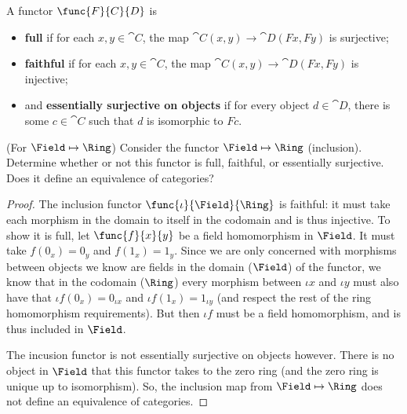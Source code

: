 \documentclass[main.tex]{subfiles}
\begin{document}
\begin{definition}
	A functor $\func{F}{C}{D}$ is
	\begin{itemize}
		\item \textbf{full} if for each $x,y\in \cat{C}$, the map $\cat{C}(x,y)\rightarrow\cat{D}(Fx,Fy)$ is surjective;
		\item \textbf{faithful} if for each $x,y\in \cat{C}$, the map $\cat{C}(x,y)\rightarrow\cat{D}(Fx,Fy)$ is injective;
		\item and \textbf{essentially surjective on objects} if for every object $d\in\cat{D}$, there is some $c\in\cat{C}$ such that $d$ is isomorphic to $Fc$.
	\end{itemize}
\end{definition}

\begin{exercise}(For $\Field\mapsto\Ring$)
	Consider the functor $\Field\mapsto\Ring$ (inclusion). Determine whether or not this functor is full, faithful, or essentially surjective. Does it define an equivalence of categories?
\end{exercise}

\begin{proof}
	The inclusion functor $\func{\iota}{\Field}{\Ring}$ is faithful: it must take each morphism in the domain to itself in the codomain and is thus injective. To show it is full, let $\func{f}{x}{y}$ be a field homomorphism in $\Field$. It must take $f(0_x)=0_y$ and $f(1_x)=1_y$. Since we are only concerned with morphisms between objects we know are fields in the domain ($\Field$) of the functor, we know that in the codomain ($\Ring$) every morphism between $\iota x$ and $\iota y$ must also have that $\iota f(0_x) = 0_{\iota x}$ and $\iota f(1_x) = 1_{\iota y}$ (and respect the rest of the ring homomorphism requirements). But then $\iota f$ must be a field homomorphism, and is thus included in $\Field$.
	
	The incusion functor is not essentially surjective on objects however. There is no object in $\Field$ that this functor takes to the zero ring (and the zero ring is unique up to isomorphism). So, the inclusion map from $\Field\mapsto\Ring$ does not define an equivalence of categories.
\end{proof}
\end{document}
